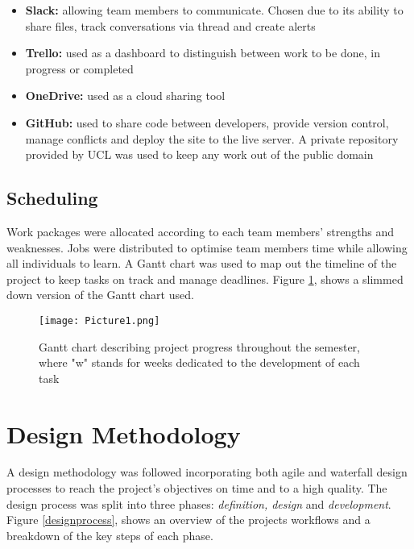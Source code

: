 \documentclass[fontsize=11pt]{extarticle}
\numberwithin{figure}{section} %
\numberwithin{table}{section}%
\providecommand{\tightlist}{%
  \setlength{\itemsep}{0pt}\setlength{\parskip}{0pt}}
\begin{document}
\begin{itemize}
\tightlist
\item
  \textbf{Slack:} allowing team members to communicate. Chosen due to
  its ability to share files, track conversations via thread and create
  alerts
\item
  \textbf{Trello:} used as a dashboard to distinguish between work to be
  done, in progress or completed
\item
  \textbf{OneDrive:} used as a cloud sharing tool
\item
  \textbf{GitHub:} used to share code between developers, provide
  version control, manage conflicts and deploy the site to the live
  server. A private repository provided by UCL was used to keep any work
  out of the public domain
\end{itemize}

\hypertarget{scheduling}{%
\subsection{Scheduling}\label{scheduling}}

Work packages were allocated according to each team members' strengths
and weaknesses. Jobs were distributed to optimise team members time
while allowing all individuals to learn. A Gantt chart was used to map
out the timeline of the project to keep tasks on track and manage
deadlines. Figure \ref{gantt}, shows a slimmed down version of the Gantt
chart used.

\begin{landscape}
\begin{figure}[H]
      \centering
      \texttt{[image: Picture1.png]}
      \caption{Gantt chart describing project progress throughout the semester, where "w" stands for weeks dedicated to the development of each task}
\label{gantt}
 \end{figure}
 \end{landscape}

\newpage

\hypertarget{design-methodology}{%
\section{Design Methodology}\label{design-methodology}}

A design methodology was followed incorporating both agile and waterfall
design processes to reach the project's objectives on time and to a high
quality. The design process was split into three phases:
\emph{definition, design} and \emph{development}. Figure
\ref{designprocess}, shows an overview of the projects workflows and a
breakdown of the key steps of each phase.
\end{document}
